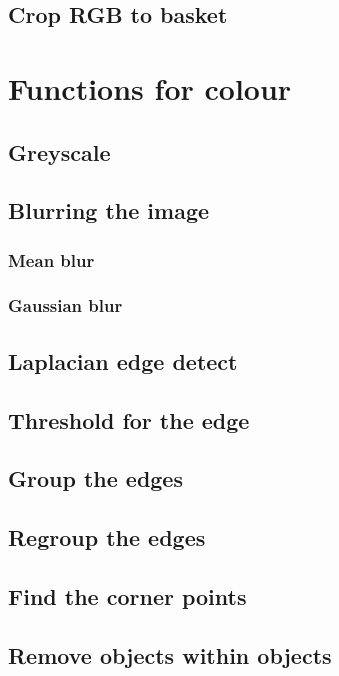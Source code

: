 \documentclass[10pt]{article}
\begin{document}
\subsection{Crop RGB to basket}


\section{Functions for colour}
\subsection{Greyscale}

\subsection{Blurring the image}
\subsubsection{Mean blur}

\subsubsection{Gaussian blur}


\subsection{Laplacian edge detect}

\subsection{Threshold for the edge}

\subsection{Group the edges}

\subsection{Regroup the edges}

\subsection{Find the corner points}

\subsection{Remove objects within objects}
\end{document}
